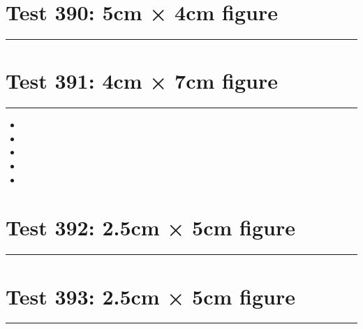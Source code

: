 \documentclass[a4paper,11pt]{article}
\begin{document}
\section*{Test 390: 5cm × 4cm figure}
\begin{swarmwrap}%
  \begin{minipage}[t]{5cm}
    \centering
    \rule{\linewidth}{4cm}
  \end{minipage}%
\end{swarmwrap}%
\swarmwrapnext
\lipsum[110]
\lipsum[111]
\lipsum[112]
\section*{Test 391: 4cm × 7cm figure}
\begin{swarmwrap}%
  \begin{minipage}[t]{4cm}
    \centering
    \rule{\linewidth}{7cm}
  \end{minipage}%
\end{swarmwrap}
\begin{itemize}
  \item \swarmwrapnext\lipsum[93][1-4]
  \item \lipsum[95][1-3]
  \item \lipsum[96][1-3]
  \item \lipsum[97][1-3]
  \item \lipsum[98][1-3]
\end{itemize}
\section*{Test 392: 2.5cm × 5cm figure}
\begin{swarmwrap}%
  \begin{minipage}[t]{2cm}
    \centering
    \rule{\linewidth}{5cm}
  \end{minipage}%
\end{swarmwrap}%
\swarmwrapnext
\lipsum[126]
\lipsum[127]
\lipsum[128]
\lipsum[129]
\lipsum[130]
\section*{Test 393: 2.5cm × 5cm figure}
\begin{swarmwrap}%
  \begin{minipage}[t]{2cm}
    \centering
    \rule{\linewidth}{5cm}
  \end{minipage}%
\end{swarmwrap}%
\swarmwrapnext
\lipsum[41]
\lipsum[42]
\lipsum[43]
\lipsum[44]
\end{document}
